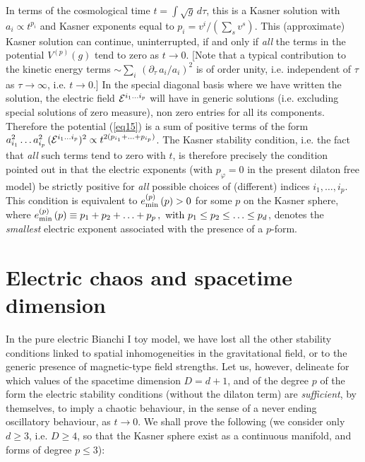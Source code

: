 \documentclass[a4paper,12pt]{article}
\begin{document}
In terms of the cosmological time $t = 
\int \sqrt g \, d\tau$,
this is a Kasner solution  
with $a_i \propto t^{p_i}$ and Kasner exponents
equal to $p_i = v^i/(\sum_s v^s)$.  
This (approximate) Kasner solution can continue, uninterrupted, if and 
only if {\it all} the terms in the potential $V^{(p)} (g)$ tend to zero 
as $t \rightarrow 0$. [Note that a typical contribution to the kinetic 
energy terms $\sim 
{\displaystyle \sum_i} \, (\partial_{\tau} \, a_i / a_i)^2$ is of order 
unity, i.e. independent of $\tau$ as $\tau \rightarrow \infty$, i.e. $t 
\rightarrow 0$.] In the special diagonal basis where we have
written the solution,
the electric field ${\cal E}^{i_1 \ldots i_p}$ will have in 
generic solutions (i.e. excluding special solutions of zero measure), 
non zero entries for all its components. 
Therefore the potential (\ref{eq15}) is a sum of positive terms of the 
form $a_{i_1}^2 \ldots a_{i_p}^2 \, ({\cal E}^{i_1 \ldots i_p})^2 
\propto t^{2 (p_{i_1} + \ldots + p_{i_p})}$. The Kasner stability 
condition, i.e. the fact that {\it all} such terms tend to zero with 
$t$, is therefore precisely the condition pointed out in \cite{dh1} 
that the electric exponents (with $p_{\varphi} 
= 0$ in the present dilaton free model) be strictly positive 
for {\it all} possible choices of (different) indices $i_1 , \ldots , 
i_p$. This condition is equivalent to $e_{{\rm min}}^{(p)} \, (p) > 0$ 
for some $p$ on the Kasner sphere, where
$e_{{\rm min}}^{(p)} \, (p) \equiv p_1 + p_2 + \ldots + p_p \, , \ 
\hbox{with} \ p_1 \leq p_2 \leq \ldots \leq p_d$,
denotes the {\it smallest} electric exponent associated with the 
presence of a $p$-form. 

\section{Electric chaos and spacetime dimension}
In the pure electric Bianchi I  toy model,  we have 
lost all the other stability conditions linked to spatial 
inhomogeneities in the gravitational field, or to the 
generic presence of magnetic-type field strengths.
Let us, however, delineate for which values of the spacetime dimension 
$D = d+1$, and of the degree $p$ of the form the electric 
stability conditions (without the dilaton term) are {\it 
sufficient}, by themselves, to imply a chaotic behaviour, in the sense 
of a never ending oscillatory behaviour, as $t \rightarrow 0$. We shall 
prove the following (we consider only $d \geq 3$, i.e. $D \geq 4$, so 
that the Kasner sphere exist as a continuous manifold, and forms of 
degree $p \leq 3$):
\end{document}
